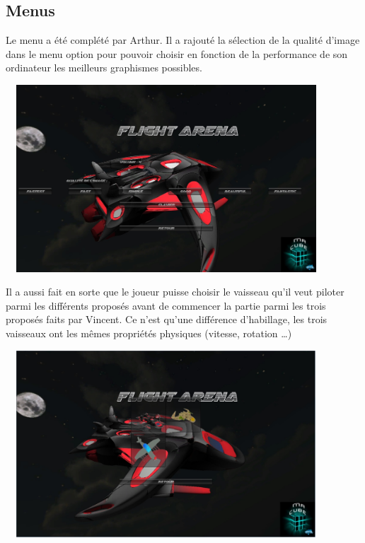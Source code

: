 \documentclass[10pt, titlepage]{report}
\begin{document}
\subsection{Menus}

Le menu a été complété par Arthur. Il a rajouté la sélection de la qualité d'image dans le menu option pour pouvoir choisir en fonction de la performance de son ordinateur les meilleurs graphismes possibles.\\

\begin{center}
\includegraphics[height=7cm, width=12cm]{menu_option.jpg}
\end{center}

Il a aussi fait en sorte que le joueur puisse choisir le vaisseau qu'il veut piloter parmi les différents proposés avant de commencer la partie parmi les trois proposés faits par Vincent. Ce n'est qu'une différence d'habillage, les trois vaisseaux ont les mêmes propriétés physiques (vitesse, rotation \dots )\\

\begin{center}
\includegraphics[height=7cm, width=12cm]{menu_selection.jpg}
\end{center}
\end{document}
